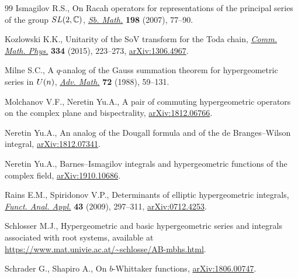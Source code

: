 \documentclass[11pt]{article}
\numberwithin{equation}{section}
\numberwithin{equation}{section}
\begin{document}
\begin{thebibliography}{99}
Ismagilov R.S., On {R}acah operators for representations of the principal
 series of the group {${\rm SL}(2,{\mathbb C})$}, \href{https://doi.org/10.1070/SM2007v198n03ABEH003840}{\textit{Sb. Math.}}
 \textbf{198} (2007), 77--90.

Kozlowski K.K., Unitarity of the {S}o{V} transform for the {T}oda chain,
 \href{https://doi.org/10.1007/s00220-014-2134-6}{\textit{Comm. Math. Phys.}} \textbf{334} (2015), 223--273, \href{https://arxiv.org/abs/1306.4967}{arXiv:1306.4967}.

Milne S.C., A {$q$}-analog of the {G}auss summation theorem for hypergeometric
 series in {${\rm U}(n)$}, \href{https://doi.org/10.1016/0001-8708(88)90019-9}{\textit{Adv. Math.}} \textbf{72} (1988), 59--131.

Molchanov V.F., Neretin Yu.A., A pair of commuting hypergeometric operators on
 the complex plane and bispectrality, \href{https://arxiv.org/abs/1812.06766}{arXiv:1812.06766}.

Neretin Yu.A., An analog of the {D}ougall formula and of the de
 {B}ranges--{W}ilson integral, \href{https://arxiv.org/abs/1812.07341}{arXiv:1812.07341}.

Neretin Yu.A., Barnes--{I}smagilov integrals and hypergeometric functions of the
 complex field, \href{https://arxiv.org/abs/1910.10686}{arXiv:1910.10686}.

Rains E.M., Spiridonov V.P., Determinants of elliptic hypergeometric integrals,
 \href{https://doi.org/10.1007/s10688-009-0037-7}{\textit{Funct. Anal. Appl.}} \textbf{43} (2009), 297--311, \href{https://arxiv.org/abs/0712.4253}{arXiv:0712.4253}.

Schlosser M.J., Hypergeometric and basic hypergeometric series and integrals
 associated with root systems, available at
 \url{https://www.mat.univie.ac.at/~schlosse/AB-mbhs.html}.

Schrader G., Shapiro A., On $b$-{W}hittaker functions, \href{https://arxiv.org/abs/1806.00747}{arXiv:1806.00747}.

\end{thebibliography}
\end{document}
